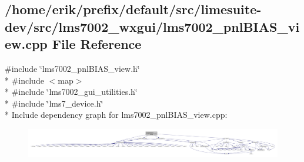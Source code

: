 \subsection{/home/erik/prefix/default/src/limesuite-\/dev/src/lms7002\+\_\+wxgui/lms7002\+\_\+pnl\+B\+I\+A\+S\+\_\+view.cpp File Reference}
\label{lms7002__pnlBIAS__view_8cpp}
{\ttfamily \#include \char`\"{}lms7002\+\_\+pnl\+B\+I\+A\+S\+\_\+view.\+h\char`\"{}}\\*
{\ttfamily \#include $<$map$>$}\\*
{\ttfamily \#include \char`\"{}lms7002\+\_\+gui\+\_\+utilities.\+h\char`\"{}}\\*
{\ttfamily \#include \char`\"{}lms7\+\_\+device.\+h\char`\"{}}\\*
Include dependency graph for lms7002\+\_\+pnl\+B\+I\+A\+S\+\_\+view.\+cpp\+:
\nopagebreak
\begin{figure}[H]
\begin{center}
\leavevmode
\includegraphics[width=350pt]{d1/dbb/lms7002__pnlBIAS__view_8cpp__incl}
\end{center}
\end{figure}
